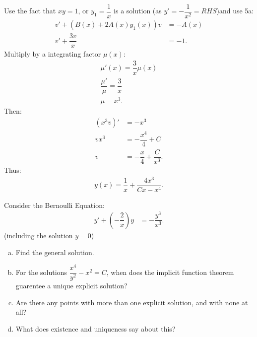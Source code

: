 \documentclass{article}
\begin{document}
    \newpage
    \begin{solution}[Problem 5b]
        Use the fact that $xy=1$, or $y_1 = \dfrac{1}{x}$ is a solution (as $y' = -\dfrac{1}{x^2}= RHS$)and use 5a:
        \begin{align}
            v' + (B(x) + 2A(x)y_1(x))v &= -A(x) \\ 
            v' + \dfrac{3v}{x} &= -1.
        \end{align}
        Multiply by a integrating factor $\mu(x)$:
        \begin{align}
            \mu'(x) = \dfrac{3}{x}\mu(x) \\
            \dfrac{\mu'}{\mu} = \dfrac{3}{x} \\ 
            \mu = x^3.
        \end{align}
        Then:
        \begin{align}
            (x^3v)' &= -x^3 \\ 
            vx^3 &= -\dfrac{x^4}{4} + C \\
            v &= -\dfrac{x}{4} + \dfrac{C}{x^3}.
        \end{align}
        Thus:
        \begin{align}
            y(x) = \dfrac{1}{x} + \dfrac{4x^3}{Cx-x^4}.
        \end{align}
    \end{solution}
    \newpage
    \begin{problem}
        Consider the Bernoulli Equation:
        \begin{align}
            y' + \left(- \dfrac{2}{x}\right) y &= -\dfrac{y^3}{x^3}. 
        \end{align}
        (including the solution $y=0$)
        \begin{enumerate}[(a)]
            \item Find the general solution.
            \item For the solutions $\dfrac{x^4}{y^2} - x^2 = C$, when does the implicit function theorem guarentee a unique explicit solution?
            \item Are there any points with more than one explicit solution, and with none at all?
            \item What does existence and uniqueness say about this?
        \end{enumerate}
    \end{problem}
\end{document}

